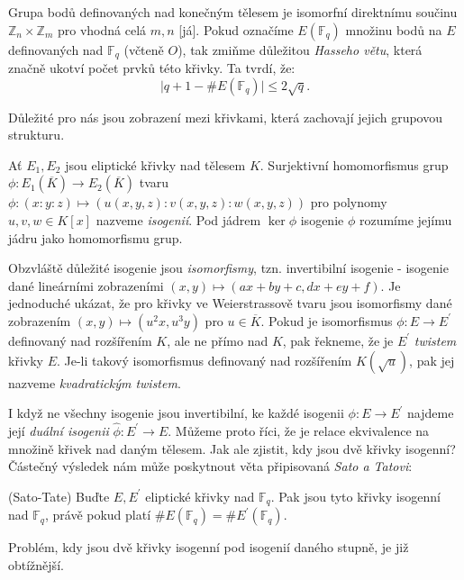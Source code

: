 \documentclass[12pt]{report}
\begin{document}
Grupa bodů definovaných nad konečným tělesem je isomorfní direktnímu součinu $\mathbb{Z}_{n} \times \mathbb{Z}_m$ pro vhodná celá $m,n$ [já]. Pokud označíme $E(\mathbb{F}_q)$  množinu bodů na $E$ definovaných nad $\mathbb{F}_q$ (včteně $O$), tak zmiňme důležitou \textit{Hasseho větu}, která značně ukotví počet prvků této křivky. Ta tvrdí, že:
\begin{equation*}
\vert q+1 - \# E(\mathbb{F}_q) \vert \leqslant 2\sqrt{q}.
\end{equation*}

Důležité pro nás jsou zobrazení mezi křivkami, která zachovají jejich grupovou strukturu.

\begin{definice}
Ať $E_1,E_2$ jsou eliptické křivky nad tělesem $K$. Surjektivní homomorfismus grup $\phi: E_1(\overline{K}) \longrightarrow E_2(\overline{K})$ tvaru $\phi : (x:y:z) \longmapsto (u(x,y,z):v(x,y,z):w(x,y,z))$ pro polynomy $u,v,w \in K[x]$ nazveme \textit{isogenií}. Pod jádrem $\ker \phi$ isogenie $\phi$ rozumíme jejímu jádru jako homomorfismu grup. 
\end{definice}

Obzvláště důležité isogenie jsou \textit{isomorfismy}, tzn. invertibilní isogenie - isogenie dané lineárními zobrazeními $(x,y) \longmapsto (ax+by+c,dx+ey+f)$. Je jednoduché ukázat, že pro křivky ve Weierstrassově tvaru jsou isomorfismy dané zobrazením $(x,y) \longmapsto (u^2 x, u^3 y)$ pro $u \in \overline{K}$. Pokud je isomorfismus $\phi : E \longrightarrow E^{\prime}$ definovaný nad rozšířením $K$, ale ne přímo nad $K$, pak řekneme, že je $E^{\prime}$ \textit{twistem} křivky $E$. Je-li takový isomorfismus definovaný nad rozšířením $K(\sqrt{u})$, pak jej nazveme \textit{kvadratickým twistem}.

I když ne všechny isogenie jsou invertibilní, ke každé isogenii $\phi : E \longrightarrow E^{\prime}$ najdeme její \textit{duální isogenii} $\widehat{\phi} : E^{\prime} \longrightarrow E$. Můžeme proto říci, že  je relace ekvivalence na množině křivek nad daným tělesem. Jak ale zjistit, kdy jsou dvě křivky isogenní? Částečný výsledek nám může poskytnout věta připisovaná \textit{Sato a Tatovi}:
\begin{veta}\label{satotate} (Sato-Tate)
Buďte $E,E^\prime$ eliptické křivky nad $\mathbb{F}_q$. Pak jsou tyto křivky isogenní nad $\mathbb{F}_q$, právě pokud platí $\#E (\mathbb{F}_q) = \#E^\prime (\mathbb{F}_q)$.
\end{veta}

Problém, kdy jsou dvě křivky isogenní pod isogenií daného stupně, je již obtížnější.
\end{document}
